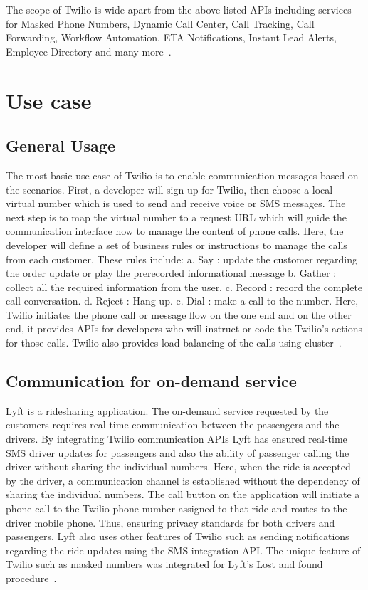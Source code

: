 The scope of Twilio is wide apart from the above-listed APIs including services 
for Masked Phone Numbers, Dynamic Call Center, Call Tracking, Call Forwarding, 
Workflow Automation, ETA Notifications, Instant Lead Alerts, Employee Directory
and many more~\cite{hid-sp18-406-twilio-architecture4}.
   
\section{Use case}
 
\subsection{General Usage}

The most basic use case of Twilio is to enable communication messages based on 
the scenarios. First, a developer will sign up for Twilio, then choose a local 
virtual number which is used to send and receive voice or SMS messages. The next
step is to map the virtual number to a request URL which will guide the 
communication interface how to manage the content of phone calls. Here, the 
developer will define a set of business rules or instructions to manage the 
calls from each customer. These rules include: 
a. Say : update the customer regarding the order update or play the prerecorded 
informational message 
b. Gather : collect all the required information from the user. 
c. Record : record the complete call conversation. 
d. Reject : Hang up. 
e. Dial : make  a call to the number.
Here, Twilio initiates the phone call or message flow on the one end and on the 
other end, it provides APIs for developers who will instruct or code the 
Twilio's actions for those calls. Twilio also provides load balancing of the 
calls using cluster~\cite{hid-sp18-406-twilio-usecase1}.

\subsection{Communication for on-demand service}

Lyft is a ridesharing application. The on-demand service requested by the 
customers requires real-time communication between the passengers and the 
drivers. By integrating Twilio communication APIs Lyft has ensured real-time 
SMS driver updates for passengers and also the ability of passenger calling the
driver without sharing the individual numbers. Here, when the ride is accepted 
by the driver, a communication channel is established without the dependency of
sharing the individual numbers. The call button on the application will 
initiate a phone call to the Twilio phone number assigned to that ride and 
routes to the driver mobile phone. Thus, ensuring privacy standards for both
drivers and passengers. Lyft also uses other features of Twilio such as sending
notifications regarding the ride updates using the SMS integration API.  
The unique feature of Twilio such as masked numbers was integrated for Lyft's 
Lost and found procedure~\cite{hid-sp18-406-twilio-usecase1}.

